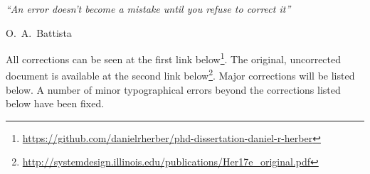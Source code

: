 
\epigraph{\textit{``An error doesn't become a mistake until you refuse to correct it''}}{\textmd{O.~A.~Battista}}

All corrections can be seen at the first link below\footnote{\url{https://github.com/danielrherber/phd-dissertation-daniel-r-herber}}.
The original, uncorrected document is available at the second link below\footnote{\url{http://systemdesign.illinois.edu/publications/Her17e_original.pdf}}.
Major corrections will be listed below.
A number of minor typographical errors beyond the corrections listed below have been fixed.

